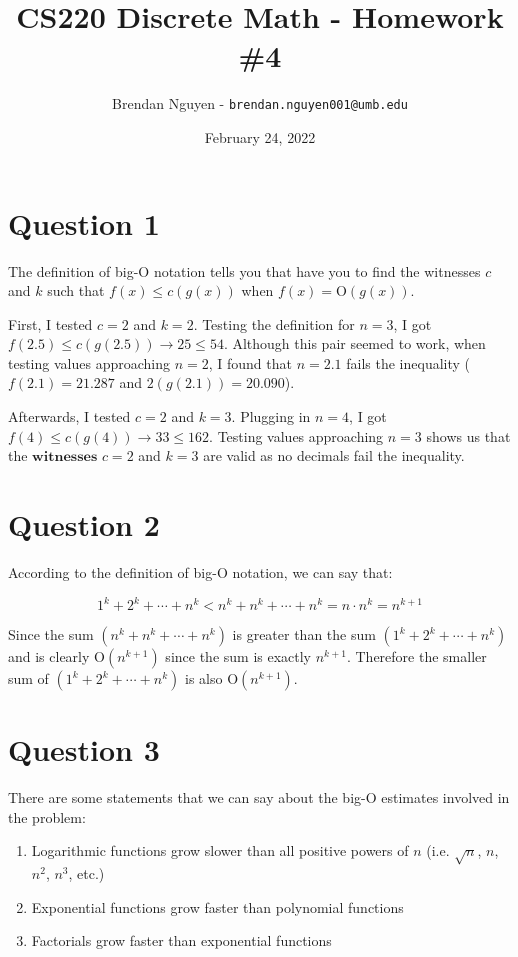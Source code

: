 \documentclass[11pt]{article}
\title{CS220 Discrete Math - Homework \#4}
\author{Brendan Nguyen - \texttt{brendan.nguyen001@umb.edu}}
\date{February 24, 2022}
\begin{document}
\maketitle

\section*{Question 1}
The definition of big-$\mathrm{O}$ notation tells you that have you to find the witnesses $c$ and $k$ such that $f(x) \leq c(g(x))$ when $f(x) = \mathrm{O}(g(x))$.

First, I tested $c=2$ and $k=2$. Testing the definition for $n=3$, I got $f(2.5) \leq c(g(2.5)) \to 25 \leq 54$. Although this pair seemed to work, when testing values approaching $n=2$, I found that $n=2.1$ fails the inequality ($f(2.1)=21.287$ and $2(g(2.1))=20.090$).

Afterwards, I tested $c=2$ and $k=3$. Plugging in $n=4$, I got $f(4) \leq c(g(4)) \to 33 \leq 162$. Testing values approaching $n=3$ shows us that the $\textbf{witnesses}$ $c=2$ and $k=3$ are valid as no decimals fail the inequality.

\section*{Question 2}
According to the definition of big-$\mathrm{O}$ notation, we can say that:

\[1^k + 2^k + \cdots + n^k < n^k + n^k + \cdots + n^k = n \cdot n^k = n^{k+1}\]

Since the sum $(n^k + n^k + \cdots + n^k)$ is greater than the sum $(1^k + 2^k + \cdots + n^k)$ and is clearly $\mathrm{O}(n^{k+1})$ since the sum is exactly $n^{k+1}$. Therefore the smaller sum of $(1^k + 2^k + \cdots + n^k)$ is also $\mathrm{O}(n^{k+1})$.

\section*{Question 3}
There are some statements that we can say about the big-$\mathrm{O}$ estimates involved in the problem:
\begin{enumerate}
    \item Logarithmic functions grow slower than all positive powers of $n$ (i.e. $\sqrt{n}$, $n$, $n^2$, $n^3$, etc.)
    \item Exponential functions grow faster than polynomial functions
    \item Factorials grow faster than exponential functions
\end{enumerate}
\end{document}
